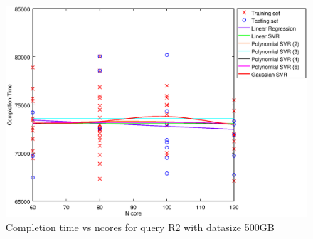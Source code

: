 
\begin {figure}[hbtp]
\centering
\includegraphics[width=\textwidth]{output/R2_500_ONLY_1_LINEAR_NCORE/plot_R2_500.eps}
\caption{Completion time vs ncores for query R2 with datasize 500GB}
\label{fig:only_1_linear_R2_500}
\end {figure}
